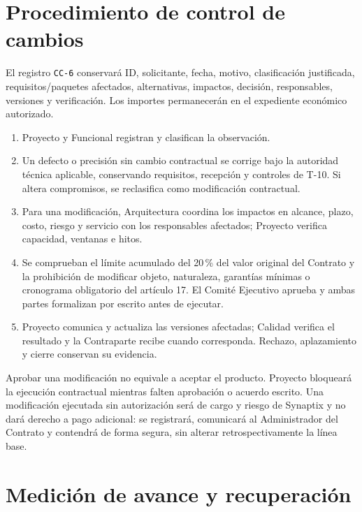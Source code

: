 \section{Procedimiento de control de cambios}

El registro \texttt{CC-6} conservará ID, solicitante, fecha, motivo, clasificación justificada, requisitos/paquetes afectados, alternativas, impactos, decisión, responsables, versiones y verificación. Los importes permanecerán en el expediente económico autorizado. \parencites[art.~72, p.~38]{sd6-ba}[RT-19.03, p.~33]{sd6-bt}

\begin{enumerate}
\item Proyecto y Funcional registran y clasifican la observación.
\item Un defecto o precisión sin cambio contractual se corrige bajo la autoridad técnica aplicable, conservando requisitos, recepción y controles de T-10. Si altera compromisos, se reclasifica como modificación contractual.
\item Para una modificación, Arquitectura coordina los impactos en alcance, plazo, costo, riesgo y servicio con los responsables afectados; Proyecto verifica capacidad, ventanas e hitos.
\item Se comprueban el límite acumulado del 20\,\% del valor original del Contrato y la prohibición de modificar objeto, naturaleza, garantías mínimas o cronograma obligatorio del artículo 17. El Comité Ejecutivo aprueba y ambas partes formalizan por escrito antes de ejecutar.
\item Proyecto comunica y actualiza las versiones afectadas; Calidad verifica el resultado y la Contraparte recibe cuando corresponda. Rechazo, aplazamiento y cierre conservan su evidencia.
\end{enumerate}

Aprobar una modificación no equivale a aceptar el producto. Proyecto bloqueará la ejecución contractual mientras falten aprobación o acuerdo escrito. Una modificación ejecutada sin autorización será de cargo y riesgo de Synaptix y no dará derecho a pago adicional: se registrará, comunicará al Administrador del Contrato y contendrá de forma segura, sin alterar retrospectivamente la línea base. \parencite[art.~72, numerales 1--5, p.~38]{sd6-ba}


\section{Medición de avance y recuperación}

